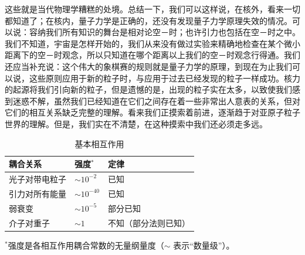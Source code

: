 这些就是当代物理学糟糕的处境。总结一下，我们可以这样说，在核外，看来一切都知道了；在核内，量子力学是正确的，还没有发现量子力学原理失效的情况。可以说：容纳我们所有知识的舞台是相对论空－时；也许引力也包括在空－时之中。我们不知道，宇宙是怎样开始的，我们从来没有做过实验来精确地检查在某个微小距离下的空－时观念，所以只知道在哪个距离以上我们的空－时观念行得通。我们还应当补充说：这个伟大的象棋赛的规则就是量子力学的原理，到现在为止我们可以说，这些原则应用于新的粒子时，与应用于过去已经发现的粒子一样成功。核力的起源将我们引向新的粒子，但是遗憾的是，出现的粒子实在太多，以致使我们感到迷惑不解，虽然我们已经知道在它们之间存在着一些非常出人意表的关系，但对它们的相互关系缺乏完整的理解。看来我们正摸索着前进，逐渐趋于对亚原子粒子世界的理解。但是，我们实在不清楚，在这种摸索中我们还必须走多远。

\begin{table}[H]
    \centering
    \caption{基本相互作用}
    \label{tab:基本相互作用}
    \medskip 
    \begin{tabular}{@{}lll@{}}
        \toprule
        耦合关系      & 强度$^*$          & 定律         \\ \midrule
        光子对带电粒子   & $\sim10^{-2}$  & 已知         \\
        引力对所有能量 & $\sim10^{-40}$ & 已知         \\
        弱衰变       & $\sim10^{-5}$  & 部分已知       \\
        介子对重子     & $\sim1$        & 不知（部分法则已知） \\ \bottomrule
    \end{tabular}

    \par\smallskip
    {\footnotesize $^{*}$强度是各相互作用耦合常数的无量纲量度（$\sim$ 表示“数量级”）。}
\end{table}